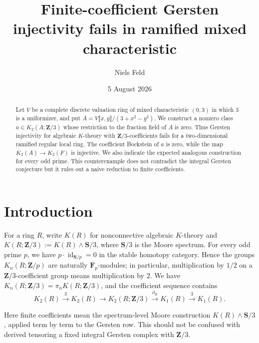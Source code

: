 \documentclass[10pt]{amsart}
\title{Finite-coefficient Gersten injectivity fails in ramified mixed characteristic}
\author{Niels Feld}
\date{5 August 2026}
\theoremstyle{remark}
\begin{document}
	
	
\begin{abstract}
Let $V$ be a complete discrete valuation ring of mixed characteristic
$(0,3)$ in which $3$ is a uniformizer, and put
$A=V\llbracket x,y\rrbracket/(3+x^2-y^3)$.  We construct a nonzero class
$a\in K_2(A;\mathbf Z/3)$ whose restriction to the fraction field of $A$
is zero.  Thus Gersten injectivity for algebraic $K$-theory with
$\mathbf Z/3$-coefficients fails for a two-dimensional ramified regular local ring.  The
coefficient Bockstein of $a$ is zero, while the map
\(K_2(A)\to K_2(F)\) is injective.
We also indicate the expected analogous construction for every odd prime.
This counterexample does not contradict the integral Gersten conjecture but it rules out a naive reduction to finite coefficients.
\end{abstract}
\maketitle

\tableofcontents

\section{Introduction}

For a ring $R$, write $K(R)$ for nonconnective algebraic $K$-theory and
\(K(R;\mathbf Z/3):=K(R)\wedge\mathbf S/3\), where \(\mathbf S/3\) is the
Moore spectrum. 
For every odd prime \(p\), we have \(p\cdot\operatorname{id}_{\mathbf S/p}=0\) in the
stable homotopy category. 
Hence the groups \(K_n(R;\mathbf Z/p)\) are
naturally \(\mathbf F_p\)-modules; in particular, multiplication by
\(1/2\) on a \(\mathbf Z/3\)-coefficient group means multiplication by
\(2\). We have \(K_n(R;\mathbf Z/3)=\pi_nK(R;\mathbf Z/3)\), and the
coefficient sequence contains
\begin{equation}\label{eq:bockstein-sequence}
	K_2(R)\xrightarrow{3}K_2(R)\longrightarrow K_2(R;\mathbf Z/3)
	\xrightarrow{\partial_R}K_1(R)\xrightarrow{3}K_1(R).
\end{equation}



Here finite coefficients mean the spectrum-level Moore construction
\(K(R)\wedge\mathbf S/3\), applied term by term to the Gersten row.
This should not be confused with derived tensoring a fixed integral
Gersten complex with \(\mathbf Z/3\).


\end{document}
